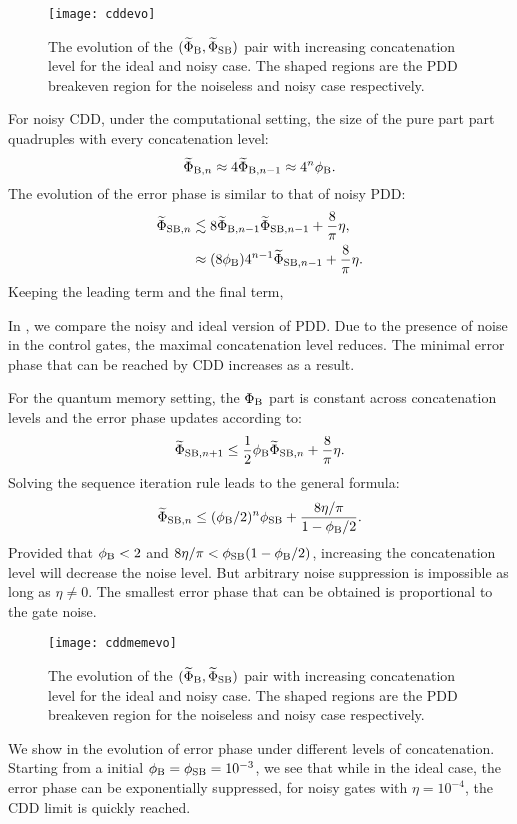 \documentclass[pra,reprint,superscriptaddress]{revtex4-2}
\newcommand{\wt}[1]{\widetilde{#1}}
\begin{document}
\begin{figure}[htbp]
 \centering
 \texttt{[image: cddevo]}
 \caption{The evolution of the $(\wt\Phi_{\rB},\wt\Phi_{\rSB})$ pair with increasing concatenation level for the ideal and noisy case.
The shaped regions are the PDD breakeven region for the 
 noiseless and noisy case respectively. }
 \label{fig:cddevo}
\end{figure}

For noisy CDD, under the computational setting, the size of the pure part 
part quadruples with every concatenation level:
\begin{equation}
 \wt\Phi_{\rB,n} \approx 4 \wt\Phi_{\rB,{n-1}}
 \approx 4^n \phi_\rB.
\end{equation} 
The evolution of the error phase is similar to that of noisy PDD:
\begin{equation}
 \begin{aligned}
 \wt\Phi_{\rSB,n} &\lesssim  8 \wt\Phi_{\rB,n-1} \wt\Phi_{\rSB,n-1}+\frac{8}{\pi}\eta,\\
&\approx (8\phi_\rB) 4^{n-1} \wt\Phi_{\rSB,n-1} + \frac{8}{\pi}\eta.\\
\end{aligned}
\end{equation}
Keeping the leading term and the final term, 


In , we compare the noisy and ideal version of PDD.
Due to the presence of noise in the control gates, the maximal concatenation 
level reduces. The minimal error phase that can be reached by CDD increases as a result. 

For the quantum memory setting, the $\Phi_{\mathrm{B}}$ part is constant across 
concatenation levels  and the error phase updates according to:
\begin{equation}
  \wt\Phi_{\rSB,n+1} \le \frac{1}{2}\phi_{\rB} \wt\Phi_{\rSB,n} + \frac{8}{\pi}\eta.
\end{equation}
Solving the sequence iteration rule leads to the general formula:
\begin{equation}
 \wt\Phi_{\rSB,n} \le (\phi_{\rB}/2)^n \phi_\rSB + \frac{8\eta/\pi}{1-\phi_{\rB}/2}.
\end{equation}
Provided that $\phi_{\mathrm{B}}<2$ and $8\eta/\pi<\phi_{\mathrm{SB}}(1-\phi_{\mathrm{B}}/2)$,
increasing the concatenation level will decrease the noise level. 
But arbitrary noise suppression is impossible as long as $\eta\neq0$. The smallest error phase that can be obtained is proportional to the gate noise. 
\begin{figure}[htbp]
 \centering
 \texttt{[image: cddmemevo]}
 \caption{The evolution of the $(\wt\Phi_{\rB},\wt\Phi_{\rSB})$ pair with increasing concatenation level for the ideal and noisy case.
The shaped regions are the PDD breakeven region for the 
 noiseless and noisy case respectively. }
 \label{fig:cddmemevo}
\end{figure}
We show in  the evolution of error phase under 
different levels of concatenation. Starting from a initial $\phi_{\mathrm{B}}=\phi_{\mathrm{SB}}=10^{-3}$, we see that while in the ideal case, the 
error phase can be exponentially suppressed, for noisy gates with $\eta=10^{-4}$, the CDD limit is quickly reached. 
\end{document}
